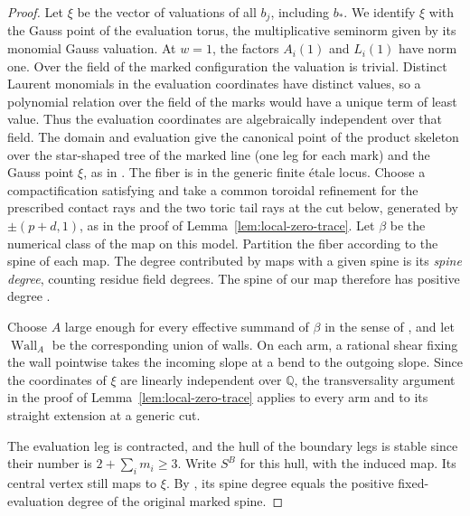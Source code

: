 \documentclass[11pt,reqno]{amsart}
\numberwithin{equation}{section}
\theoremstyle{definition}
\theoremstyle{remark}
\begin{document}
\begin{proof}
Let \(\xi\) be the vector of valuations of all \(b_j\), including
\(b_*\). We identify \(\xi\) with the Gauss point of the evaluation
torus, the multiplicative seminorm given by its monomial Gauss valuation.
At \(w=1\), the factors \(A_i(1)\) and \(L_i(1)\) have
norm one. Over the field of the marked configuration the valuation
is trivial. Distinct Laurent monomials in the evaluation coordinates
have distinct values, so a polynomial relation over the field of
the marks would have a unique term of least value. Thus the evaluation
coordinates are algebraically independent over that field. The domain
and evaluation give the canonical point of the product skeleton over the
star-shaped tree of the marked line (one leg for each mark) and the Gauss
point \(\xi\), as in \cite[Proposition~8.8 and \S14.1]{KY}. The fiber is in the
generic finite \'etale locus. Choose a compactification satisfying
\cite[Assumption~2.4]{KY} and take a common toroidal refinement for the
prescribed contact rays and the two toric tail rays at the cut below,
generated by \(\pm(p+d,1)\), as in the proof of
Lemma~\ref{lem:local-zero-trace}. Let \(\beta\) be the numerical
class of the map on this model. Partition the fiber according to
the spine of each map. The degree contributed by maps with a given
spine is its \emph{spine degree}, counting residue field degrees.
The spine of our map therefore has positive degree
\cite[Construction~9.2, Lemmas~8.20--8.22]{KY}.

Choose \(A\) large enough for every effective summand of \(\beta\) in
the sense of \cite[Definition~4.28]{KY}, and let \(\operatorname{Wall}_A\)
be the corresponding union of walls.
On each arm, a rational shear fixing the wall pointwise takes the
incoming slope at a bend to the outgoing slope. Since the coordinates of \(\xi\) are
linearly independent over \(\mathbb Q\), the transversality argument
in the proof of Lemma~\ref{lem:local-zero-trace} applies to every arm
and to its straight extension at a generic cut.

The evaluation leg is contracted, and the hull of the boundary legs
is stable since their number is \(2+\sum_i m_i\ge3\).
Write \(S^B\) for this hull, with the induced map. Its central vertex
still maps to \(\xi\). By \cite[Theorem~9.14]{KY}, its spine degree
equals the positive fixed-evaluation degree of the original marked spine.


\end{proof}
\end{document}
